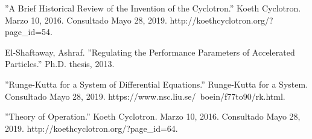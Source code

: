 \documentclass[letterpaper, 11pt]{article}
\begin{document}
\begin{multicols}{2}
\begin{thebibliography}{9}
    ''A Brief Historical Review of the Invention of the Cyclotron.'' Koeth Cyclotron. Marzo 10, 2016. Consultado Mayo 28, 2019. http://koethcyclotron.org/?page\_id=54.
    
    El-Shaftaway, Ashraf. ''Regulating the Performance Parameters of Accelerated Particles.'' Ph.D. thesis, 2013.
    
    ''Runge-Kutta for a System of Differential Equations.'' Runge-Kutta for a System. Consultado Mayo 28, 2019. https://www.nsc.liu.se/~boein/f77to90/rk.html.
    
    ''Theory of Operation.'' Koeth Cyclotron. Marzo 10, 2016. Consultado Mayo 28, 2019. http://koethcyclotron.org/?page\_id=64.
\end{thebibliography}

\end{multicols}
\end{document}
